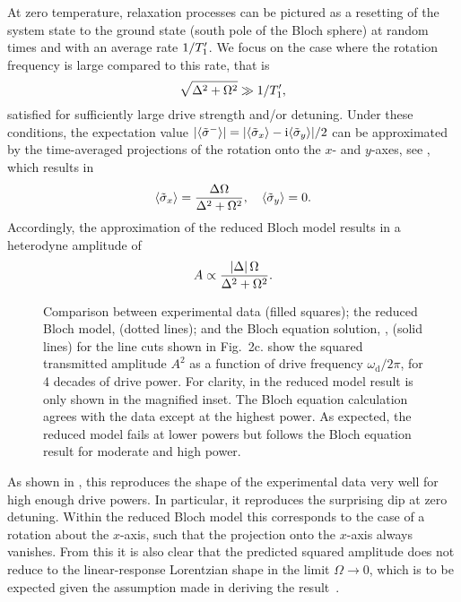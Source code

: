 At zero temperature, relaxation processes can be pictured as a resetting of the system state to the ground state (south pole of the Bloch sphere) at random times and with an average rate $1/T'_1$. We focus on the case where the rotation frequency is large compared to this rate, that is
\begin{equation}\label{highpower}
\sqrt{\Delta^2+\Omega^2}\gg 1/T'_1,
\end{equation}
satisfied for sufficiently large drive strength and/or detuning. Under these conditions, the expectation value $\lvert\langle\tilde{\sigma}^-\rangle\rvert = \lvert\langle\tilde{\sigma}_x\rangle-\mathrm{i}\langle\tilde{\sigma}_y\rangle\rvert/2$ can be approximated by the time-averaged projections of the rotation onto the $x$- and $y$-axes, see , which results in
\begin{align}
\langle\tilde{\sigma}_x\rangle =\frac{\Delta\Omega}{\Delta^2+\Omega^2},\quad \langle\tilde{\sigma}_y\rangle = 0 .
\end{align}
Accordingly, the approximation of the reduced Bloch model results in a heterodyne amplitude of
\begin{equation}\label{reducedblochresult}
A\propto\frac{\left\lvert \Delta\right\rvert\Omega}{\Delta^2+\Omega^2} .
\end{equation}%
\begin{figure}
 \centering
 \caption[Supersplitting of the vacuum Rabi peak in experiment and theory] { Comparison between experimental data (filled squares); the reduced Bloch model,  (dotted lines); and the Bloch equation solution, , (solid lines) for the line cuts shown in Fig.~2c.  show the squared transmitted amplitude $A^2$ as a function of drive frequency $\omega_\text{d}/2\pi$, for 4 decades of drive power. For clarity, in  the reduced model result is only shown in the magnified inset. The Bloch equation calculation agrees with the data except at the highest power. As expected, the reduced model fails at lower powers but follows the Bloch equation result for moderate and high power.\label{fig:linecuts}}
 \end{figure}%
As shown in , this reproduces the shape of the experimental data very well for high enough drive powers. In particular, it reproduces the surprising dip at zero detuning. Within the reduced Bloch model this corresponds to the case of a rotation about the $x$-axis, such that the projection onto the $x$-axis always vanishes. From this it is also clear that the predicted squared amplitude does not reduce to the linear-response Lorentzian shape in the limit $\Omega\rightarrow0$, which is to be expected given the assumption  made in deriving the result~.

